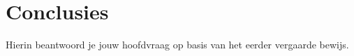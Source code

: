 \section{Conclusies}
\label{sec:conc}

Hierin beantwoord je jouw hoofdvraag op basis van het eerder vergaarde bewijs.
